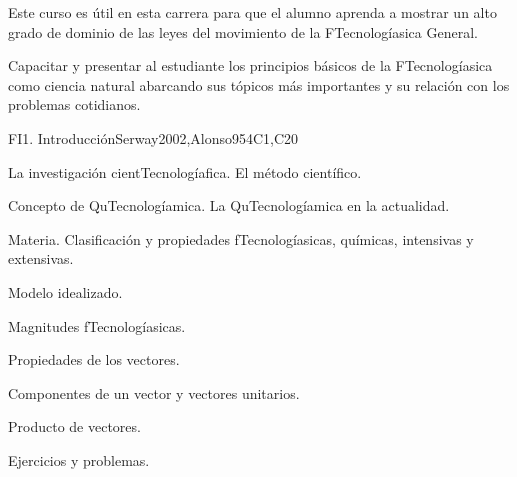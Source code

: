 \begin{syllabus}


\begin{justification}

Este curso es útil en esta carrera para que el alumno aprenda a mostrar un alto grado de dominio de las leyes del movimiento de la FTecnologíasica General.

\end{justification}

\begin{goals}
\item Capacitar y presentar al estudiante los principios básicos de la FTecnologíasica como ciencia natural abarcando sus tópicos más importantes y su relación con los problemas cotidianos.
\end{goals}

\begin{outcomes}
  \item {}
  \item {}
  \item {}
\end{outcomes}

\begin{competences}
    \item {}
    \item {}
\end{competences}

\begin{unit}{FI1. Introducción}{}{Serway2002,Alonso95}{4}{C1,C20}
\begin{topics}
      \item La investigación cientTecnologíafica. El método científico.
      \item Concepto de QuTecnologíamica. La QuTecnologíamica en la actualidad.
      \item Materia. Clasificación y propiedades fTecnologíasicas, químicas, intensivas y extensivas.
      \item Modelo idealizado.
      \item Magnitudes fTecnologíasicas.
      \item Propiedades de los vectores.
      \item Componentes de un vector y vectores unitarios.
      \item Producto de vectores.
      \item Ejercicios y problemas.
   \end{topics}


\end{unit}
\end{syllabus}
